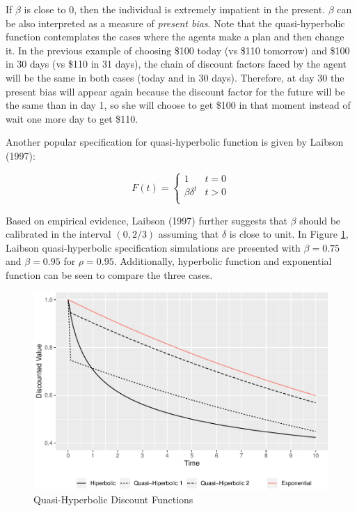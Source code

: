 \documentclass[]{article}
\begin{document}
If \(\beta\) is close to \(0\), then the individual is extremely impatient in the present. \(\beta\) can be also interpreted as a measure of \emph{present bias}. Note that the quasi-hyperbolic function contemplates the cases where the agents make a plan and then change it. In the previous example of choosing \$100 today (vs \$110 tomorrow) and \$100 in 30 days (vs \$110 in 31 days), the chain of discount factors faced by the agent will be the same in both cases (today and in 30 days). Therefore, at day 30 the present bias will appear again because the discount factor for the future will be the same than in day 1, so she will choose to get \$100 in that moment instead of wait one more day to get \$110.

Another popular specification for quasi-hyperbolic function is given by Laibson (1997):

\[ F(t)=\begin{cases} 
1 & t = 0 \\
\beta\delta^t & t>0 \\ 
\end{cases}
\]

Based on empirical evidence, Laibson (1997) further suggests that \(\beta\) should be calibrated in the interval \((0, 2/3 )\) assuming that \(\delta\) is close to unit. In Figure \ref{fig:qh}, Laibson quasi-hyperbolic specification simulations are presented with \(\beta=0.75\) and \(\beta=0.95\) for \(\rho=0.95\). Additionally, hyperbolic function and exponential function can be seen to compare the three cases.

\begin{figure}

{\centering \includegraphics[width=0.75\linewidth]{Behavioral_v_pdf_files/figure-latex/qh-1} 

}

\caption{Quasi-Hyperbolic Discount Functions}\label{fig:qh}
\end{figure}
\end{document}
